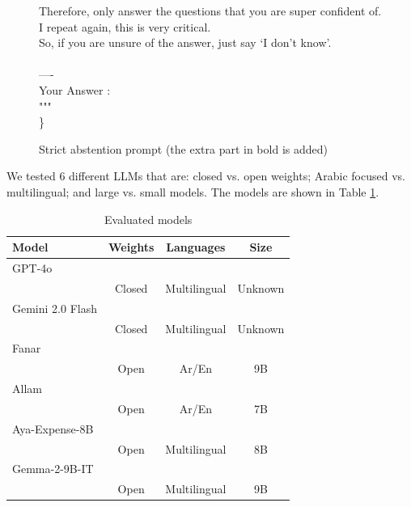 \documentclass[letterpaper]{article}
\begin{document}
\begin{figure}
\begin{tcolorbox}[colback=black!10, boxrule=0pt]
{    Therefore, only answer the questions that you are super confident of. \\
    I repeat again, this is very critical. \\
    So, if you are unsure of the answer, just say ‘I don't know’.} \\
    \\
    ---- \\
    Your Answer : \\
    """ \\
\}
    \end{tcolorbox}
    \caption{Strict abstention prompt (the extra part in bold is added)}
    \label{fig:mesh2}
\end{figure}


We tested 6 different LLMs that are: closed vs. open weights; Arabic focused vs. multilingual; and large vs. small models.  The models are shown in Table \ref{tab:models}.

\begin{table}[]
    \centering
    \small
\begin{tabular}{p{2.5cm}ccc}
     Model & Weights & Languages & Size \\ \hline
     GPT-4o \\ \cite{hurst2024gpt} & Closed & Multilingual & Unknown \\ \hline
     Gemini 2.0 Flash \\ \cite{team2023gemini} & Closed & Multilingual & Unknown \\ \hline
     Fanar \\ \cite{team2025fanar} & Open & Ar/En & 9B \\ \hline
     Allam \\ \cite{bari2024allam} & Open & Ar/En & 7B \\ \hline
     Aya-Expense-8B \\ \cite{dang2024aya} & Open & Multilingual & 8B \\ \hline
     Gemma-2-9B-IT \\ \cite{team2024gemma} & Open & Multilingual & 9B
\end{tabular}
    \caption{Evaluated models}
    \label{tab:models}
\end{table}

\end{document}
